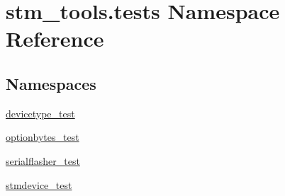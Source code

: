 \hypertarget{namespacestm__tools_1_1tests}{}\section{stm\+\_\+tools.\+tests Namespace Reference}
\label{namespacestm__tools_1_1tests}
\subsection*{Namespaces}
\begin{DoxyCompactItemize}
\item 
 \hyperlink{namespacestm__tools_1_1tests_1_1devicetype__test}{devicetype\+\_\+test}
\item 
 \hyperlink{namespacestm__tools_1_1tests_1_1optionbytes__test}{optionbytes\+\_\+test}
\item 
 \hyperlink{namespacestm__tools_1_1tests_1_1serialflasher__test}{serialflasher\+\_\+test}
\item 
 \hyperlink{namespacestm__tools_1_1tests_1_1stmdevice__test}{stmdevice\+\_\+test}
\end{DoxyCompactItemize}
